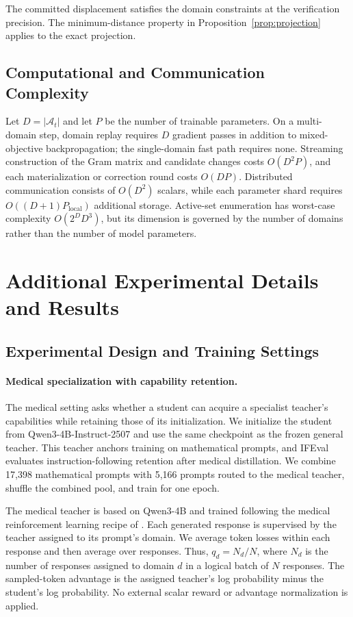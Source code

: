 \documentclass{article}
\begin{document}
The committed displacement satisfies the domain constraints at the verification precision. The minimum-distance property in Proposition~\ref{prop:projection} applies to the exact projection.

\subsection{Computational and Communication Complexity}
\label{app:complexity}

Let $D=|\mathcal A_t|$ and let $P$ be the number of trainable parameters. On a multi-domain step, domain replay requires $D$ gradient passes in addition to mixed-objective backpropagation; the single-domain fast path requires none. Streaming construction of the Gram matrix and candidate changes costs $O(D^2P)$, and each materialization or correction round costs $O(DP)$. Distributed communication consists of $O(D^2)$ scalars, while each parameter shard requires $O((D+1)P_{\mathrm{local}})$ additional storage. Active-set enumeration has worst-case complexity $O(2^DD^3)$, but its dimension is governed by the number of domains rather than the number of model parameters.

\section{Additional Experimental Details and Results}
\label{app:experiments}

\subsection{Experimental Design and Training Settings}
\label{app:exp_training}

\paragraph{Medical specialization with capability retention.}
The medical setting asks whether a student can acquire a specialist
teacher's capabilities while retaining those of its initialization.
We initialize the student from Qwen3-4B-Instruct-2507 and use the same
checkpoint as the frozen general teacher. This teacher anchors training
on mathematical prompts, and IFEval evaluates instruction-following
retention after medical distillation.
We combine 17,398 mathematical prompts with 5,166 prompts routed to the
medical teacher, shuffle the combined pool, and train for one epoch.

The medical teacher is based on Qwen3-4B and trained following the medical reinforcement learning recipe of \citet{zhu2026conrubmed}.
Each generated response is supervised by the teacher assigned to its
prompt's domain. We average token losses within each response and then
average over responses. Thus, $q_d=N_d/N$, where $N_d$ is the number of
responses assigned to domain $d$ in a logical batch of $N$ responses.
The sampled-token advantage is the assigned teacher's log probability
minus the student's log probability. No external scalar reward or
advantage normalization is applied.
\end{document}
